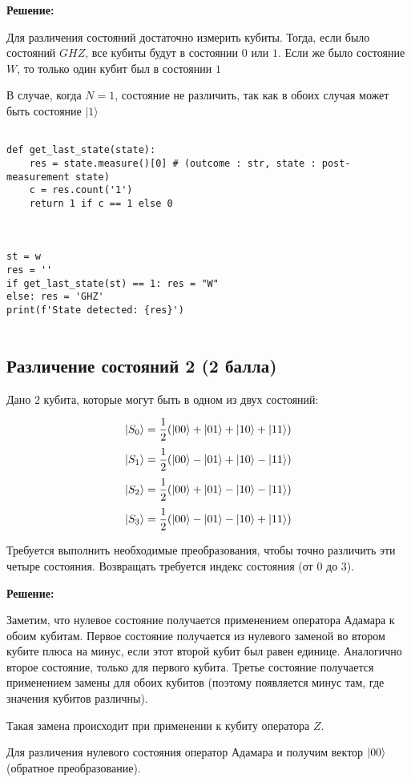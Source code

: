 \documentclass[a4paper]{article}
\begin{document}
\textbf{Решение:}

Для различения состояний достаточно измерить кубиты. Тогда, если было состояний $GHZ$, все кубиты будут в состоянии $0$ или $1$. Если же было состояние $W$, то только один кубит был в состоянии $1$

В случае, когда $N = 1$, состояние не различить, так как в обоих случая может быть состояние $|1\rangle$

\begin{verbatim}

def get_last_state(state):
    res = state.measure()[0] # (outcome : str, state : post-measurement state) 
    c = res.count('1')
    return 1 if c == 1 else 0



st = w
res = ''
if get_last_state(st) == 1: res = "W"
else: res = 'GHZ'
print(f'State detected: {res}')


\end{verbatim}

\subsection{Различение состояний 2 (2 балла)}

Дано $2$ кубита, которые могут быть в одном из двух состояний:

$$\Ket{S_0} = \frac{1}{2}(\Ket{00} + \Ket{01} + \Ket{10} + \Ket{11})$$
$$\Ket{S_1} = \frac{1}{2}(\Ket{00} - \Ket{01} + \Ket{10} - \Ket{11})$$
$$\Ket{S_2} = \frac{1}{2}(\Ket{00} + \Ket{01} - \Ket{10} - \Ket{11})$$
$$\Ket{S_3} = \frac{1}{2}(\Ket{00} - \Ket{01} - \Ket{10} + \Ket{11})$$


Требуется выполнить необходимые преобразования, чтобы точно различить эти четыре состояния. Возвращать требуется индекс состояния (от $0$ до $3$). 

\textbf{Решение:}

Заметим, что нулевое состояние получается применением оператора Адамара к обоим кубитам. 
Первое состояние получается из нулевого заменой во втором кубите плюса на минус, если этот второй кубит был равен единице. 
Аналогично второе состояние, только для первого кубита. 
Третье состояние получается применением замены для обоих кубитов (поэтому появляется минус там, где значения кубитов различны).

Такая замена происходит при применении к кубиту оператора $Z$. 

Для различения нулевого состояния оператор Адамара и получим вектор $\Ket{00}$ (обратное преобразование).
\end{document}

